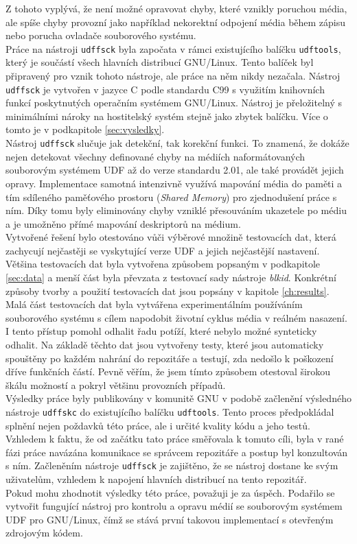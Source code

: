 Z tohoto vyplývá, že není možné opravovat chyby, které vznikly poruchou média, ale spíše chyby provozní jako například nekorektní odpojení média během zápisu nebo porucha ovladače souborového systému.\\
Práce na nástroji \texttt{udffsck} byla započata v rámci existujícího balíčku \texttt{udftools}, který je součástí všech hlavních distribucí GNU/Linux. Tento balíček byl připravený pro vznik tohoto nástroje, ale práce na něm nikdy nezačala. Nástroj \texttt{udffsck} je vytvořen v jazyce C podle standardu C99 s využitím knihovních funkcí poskytnutých operačním systémem \mbox{GNU/Linux}. Nástroj je přeložitelný s minimálními nároky na hostitelský systém stejně jako zbytek balíčku. Více o tomto je v podkapitole \ref{sec:vysledky}.\\
Nástroj \texttt{udffsck} slučuje jak detekční, tak korekční funkci. To znamená, že dokáže nejen detekovat všechny definované chyby na médiích naformátovaných souborovým systémem UDF až do verze standardu 2.01, ale také provádět jejich opravy. Implementace samotná intenzivně využívá mapování média do paměti a tím sdíleného paměťového prostoru (\textit{Shared Memory}) pro zjednodušení práce s ním. Díky tomu byly eliminovány chyby vzniklé přesouváním ukazetele po médiu a je umožněno přímé mapování deskriptorů na médium.\\
Vytvořené řešení bylo otestováno vůči výběrové množině testovacích dat, která zachycují nejčastěji se vyskytující verze UDF a jejich nejčastější nastavení. Většina testovacích dat byla vytvořena způsobem popsaným v podkapitole \ref{sec:data} a menší část byla převzata z testovací sady nástroje \textit{blkid}. Konkrétní způsoby tvorby a použití testovacích dat jsou popsány v kapitole \ref{ch:results}. Malá část testovacích dat byla vytvářena experimentálním používáním souborového systému s cílem napodobit životní cyklus média v reálném nasazení. I tento přístup pomohl odhalit řadu potíží, které nebylo možné synteticky odhalit. Na základě těchto dat jsou vytvořeny testy, které jsou automaticky spouštěny po každém nahrání do repozitáře a testují, zda nedošlo k poškození dříve funkčních částí. Pevně věřím, že jsem tímto způsobem otestoval širokou škálu možností a pokryl většinu provozních případů.\\
Výsledky práce byly publikovány v komunitě GNU v podobě začlenění výsledného nástroje \texttt{udffskc} do existujícího balíčku \texttt{udftools}. Tento proces předpokládal splnění nejen poždavků této práce, ale i určité kvality kódu a jeho testů. Vzhledem k faktu, že od začátku tato práce směřovala k tomuto cíli, byla v rané fázi práce navázána komunikace se správcem repozitáře a postup byl konzultován s ním. Začleněním nástroje \texttt{udffsck} je zajištěno, že se nástroj dostane ke svým uživatelům, vzhledem k napojení hlavních distribucí na tento repozitář.\\
Pokud mohu zhodnotit výsledky této práce, považuji je za úspěch. Podařilo se vytvořit fungující nástroj pro kontrolu a opravu médií se souborovým systémem UDF pro GNU/Linux, čímž se stává první takovou implementací s otevřeným zdrojovým kódem.
